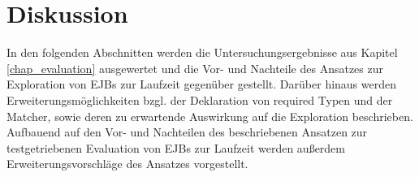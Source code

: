 \chapter{Diskussion}\label{chap_disc}
In den folgenden Abschnitten werden die Untersuchungsergebnisse aus Kapitel \ref{chap_evaluation} ausgewertet und die Vor- und Nachteile des Ansatzes zur Exploration von EJBs zur Laufzeit gegenüber gestellt. Darüber hinaus werden Erweiterungsmöglichkeiten bzgl. der Deklaration von required Typen und der Matcher, sowie deren zu erwartende Auswirkung auf die Exploration beschrieben. Aufbauend auf den Vor- und Nachteilen des beschriebenen Ansatzen zur testgetriebenen Evaluation von EJBs zur Laufzeit werden außerdem Erweiterungsvorschläge des Ansatzes vorgestellt.


 
